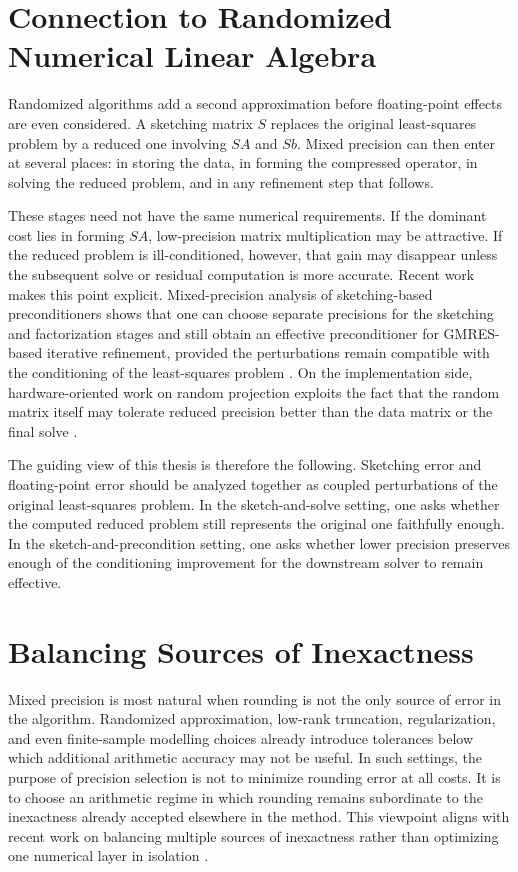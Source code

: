 \section{Connection to Randomized Numerical Linear Algebra}

Randomized algorithms add a second approximation before floating-point effects
are even considered. A sketching matrix \(S\) replaces the original least-squares
problem by a reduced one involving \(SA\) and \(Sb\). Mixed precision can then
enter at several places: in storing the data, in forming the compressed operator,
in solving the reduced problem, and in any refinement step that follows.

These stages need not have the same numerical requirements. If the dominant cost
lies in forming \(SA\), low-precision matrix multiplication may be attractive. If
the reduced problem is ill-conditioned, however, that gain may disappear unless
the subsequent solve or residual computation is more accurate. Recent work makes
this point explicit. Mixed-precision analysis of sketching-based preconditioners
shows that one can choose separate precisions for the sketching and factorization
stages and still obtain an effective preconditioner for GMRES-based iterative
refinement, provided the perturbations remain compatible with the conditioning of
the least-squares problem \cite{carson2024mixedsketching}. On the implementation
side, hardware-oriented work on random projection exploits the fact that the
random matrix itself may tolerate reduced precision better than the data matrix or
the final solve \cite{ootomo2023mixedprojection}.

The guiding view of this thesis is therefore the following. Sketching error and
floating-point error should be analyzed together as coupled perturbations of the
original least-squares problem. In the sketch-and-solve setting, one asks whether
the computed reduced problem still represents the original one faithfully enough.
In the sketch-and-precondition setting, one asks whether lower precision preserves
enough of the conditioning improvement for the downstream solver to remain
effective.

\section{Balancing Sources of Inexactness}

Mixed precision is most natural when rounding is not the only source of error in
the algorithm. Randomized approximation, low-rank truncation, regularization,
and even finite-sample modelling choices already introduce tolerances below which
additional arithmetic accuracy may not be useful. In such settings, the purpose of
precision selection is not to minimize rounding error at all costs. It is to choose
an arithmetic regime in which rounding remains subordinate to the inexactness
already accepted elsewhere in the method. This viewpoint aligns with recent work
on balancing multiple sources of inexactness rather than optimizing one numerical
layer in isolation \cite{carson2026balancing,higham2022mixed}.

